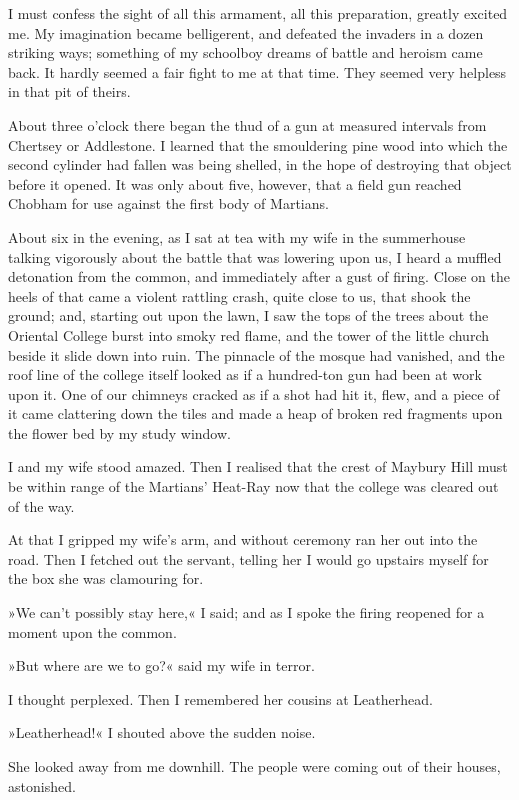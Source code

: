 I must confess the sight of all this armament, all this preparation, greatly excited me. My imagination became belligerent, and defeated the invaders in a dozen striking ways; something of my schoolboy dreams of battle and heroism came back. It hardly seemed a fair fight to me at that time. They seemed very helpless in that pit of theirs.

About three o'clock there began the thud of a gun at measured intervals from Chertsey or Addlestone. I learned that the smouldering pine wood into which the second cylinder had fallen was being shelled, in the hope of destroying that object before it opened. It was only about five, however, that a field gun reached Chobham for use against the first body of Martians.

About six in the evening, as I sat at tea with my wife in the summerhouse talking vigorously about the battle that was lowering upon us, I heard a muffled detonation from the common, and immediately after a gust of firing. Close on the heels of that came a violent rattling crash, quite close to us, that shook the ground; and, starting out upon the lawn, I saw the tops of the trees about the Oriental College burst into smoky red flame, and the tower of the little church beside it slide down into ruin. The pinnacle of the mosque had vanished, and the roof line of the college itself looked as if a hundred-ton gun had been at work upon it. One of our chimneys cracked as if a shot had hit it, flew, and a piece of it came clattering down the tiles and made a heap of broken red fragments upon the flower bed by my study window.

I and my wife stood amazed. Then I realised that the crest of Maybury Hill must be within range of the Martians' Heat-Ray now that the college was cleared out of the way.

At that I gripped my wife's arm, and without ceremony ran her out into the road. Then I fetched out the servant, telling her I would go upstairs myself for the box she was clamouring for.

»We can't possibly stay here,« I said; and as I spoke the firing reopened for a moment upon the common.

»But where are we to go?« said my wife in terror.

I thought perplexed. Then I remembered her cousins at Leatherhead.

»Leatherhead!« I shouted above the sudden noise.

She looked away from me downhill. The people were coming out of their houses, astonished.

